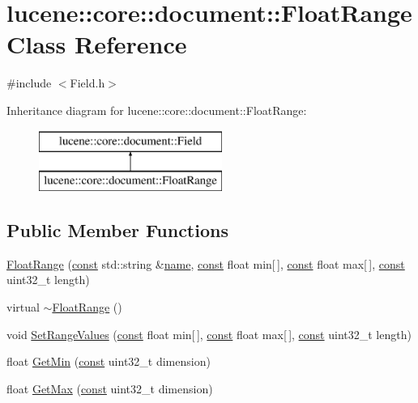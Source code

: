 \hypertarget{classlucene_1_1core_1_1document_1_1FloatRange}{}\section{lucene\+:\+:core\+:\+:document\+:\+:Float\+Range Class Reference}
\label{classlucene_1_1core_1_1document_1_1FloatRange}


{\ttfamily \#include $<$Field.\+h$>$}

Inheritance diagram for lucene\+:\+:core\+:\+:document\+:\+:Float\+Range\+:\begin{figure}[H]
\begin{center}
\leavevmode
\includegraphics[height=2.000000cm]{classlucene_1_1core_1_1document_1_1FloatRange}
\end{center}
\end{figure}
\subsection*{Public Member Functions}
\begin{DoxyCompactItemize}
\item 
\mbox{\hyperlink{classlucene_1_1core_1_1document_1_1FloatRange_a69d45b11fa82af7396120419ece24be4}{Float\+Range}} (\mbox{\hyperlink{ZlibCrc32_8h_a2c212835823e3c54a8ab6d95c652660e}{const}} std\+::string \&\mbox{\hyperlink{classlucene_1_1core_1_1document_1_1Field_a52f673f3b3abb14b180f5159f4726537}{name}}, \mbox{\hyperlink{ZlibCrc32_8h_a2c212835823e3c54a8ab6d95c652660e}{const}} float min\mbox{[}$\,$\mbox{]}, \mbox{\hyperlink{ZlibCrc32_8h_a2c212835823e3c54a8ab6d95c652660e}{const}} float max\mbox{[}$\,$\mbox{]}, \mbox{\hyperlink{ZlibCrc32_8h_a2c212835823e3c54a8ab6d95c652660e}{const}} uint32\+\_\+t length)
\item 
virtual \mbox{\hyperlink{classlucene_1_1core_1_1document_1_1FloatRange_a21159cec07e157c991dd7da09fec5ad7}{$\sim$\+Float\+Range}} ()
\item 
void \mbox{\hyperlink{classlucene_1_1core_1_1document_1_1FloatRange_af9827075d0e5277455e9cadd16e79f6d}{Set\+Range\+Values}} (\mbox{\hyperlink{ZlibCrc32_8h_a2c212835823e3c54a8ab6d95c652660e}{const}} float min\mbox{[}$\,$\mbox{]}, \mbox{\hyperlink{ZlibCrc32_8h_a2c212835823e3c54a8ab6d95c652660e}{const}} float max\mbox{[}$\,$\mbox{]}, \mbox{\hyperlink{ZlibCrc32_8h_a2c212835823e3c54a8ab6d95c652660e}{const}} uint32\+\_\+t length)
\item 
float \mbox{\hyperlink{classlucene_1_1core_1_1document_1_1FloatRange_ab39e75504d05629914310e93f8c468d4}{Get\+Min}} (\mbox{\hyperlink{ZlibCrc32_8h_a2c212835823e3c54a8ab6d95c652660e}{const}} uint32\+\_\+t dimension)
\item 
float \mbox{\hyperlink{classlucene_1_1core_1_1document_1_1FloatRange_a99ad9287e0363b51af717ca02664a6c6}{Get\+Max}} (\mbox{\hyperlink{ZlibCrc32_8h_a2c212835823e3c54a8ab6d95c652660e}{const}} uint32\+\_\+t dimension)
\end{DoxyCompactItemize}
